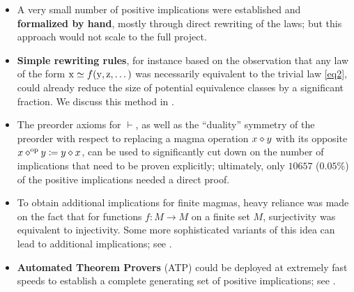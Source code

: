 \begin{itemize}
    \item A very small number of positive implications were established and \textbf{formalized by hand}, mostly through direct rewriting of the laws; but this approach would not scale to the full project.
    \item \textbf{Simple rewriting rules}, for instance based on the observation that any law of the form $\mathrm{x} \simeq f(\mathrm{y},\mathrm{z},\dots)$ was necessarily equivalent to the trivial law \eqref{eq2}, could already reduce the size of potential equivalence classes by a significant fraction. We discuss this method in .
    \item The preorder axioms for $\vdash$, as well as the ``duality'' symmetry of the preorder with respect to replacing a magma operation $x \diamond y$ with its opposite $x \diamond^{\mathrm{op}} y \coloneqq y \diamond x$, can be used to significantly cut down on the number of implications that need to be proven explicitly; ultimately, only $10657$ ($0.05\%$) of the positive implications needed a direct proof.
    \item To obtain additional implications for finite magmas, heavy reliance was made on the fact that for functions $f \colon M \to M$ on a finite set $M$, surjectivity was equivalent to injectivity.  Some more sophisticated variants of this idea can lead to additional implications; see .
    \item \textbf{Automated Theorem Provers} (ATP) could be deployed at extremely fast speeds to establish a complete generating set of positive implications; see .
\end{itemize}

